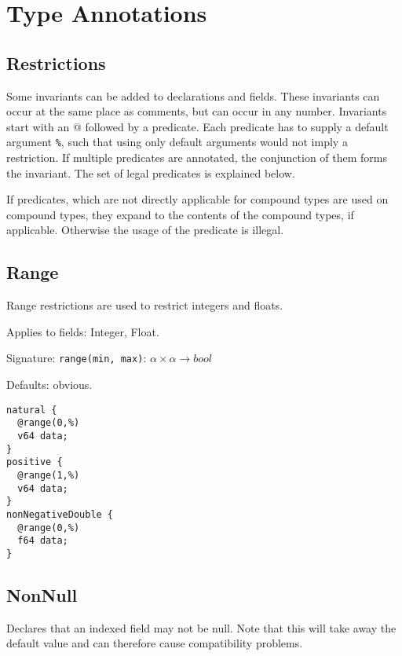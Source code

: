 \section{Type Annotations}

\subsection{Restrictions}
Some invariants can be added to declarations and fields. These invariants can occur at the same place as comments, but can occur in any number. Invariants start with an \textsc{@} followed by a predicate. Each predicate has to supply a default argument \texttt{\%}, such that using only default arguments would not imply a restriction.
If multiple predicates are annotated, the conjunction of them forms the invariant.
The set of legal predicates is explained below.

If predicates, which are not directly applicable for compound types are used on compound types, they expand to the contents of the compound types, if applicable. Otherwise the usage of the predicate is illegal.



\subsection*{Range}
Range restrictions are used to restrict integers and floats.

Applies to fields: Integer, Float.

Signature: \verb/range(min, max)/: $\alpha \times \alpha → bool$

Defaults: obvious.

\begin{lstlisting}[label=rangeExample,caption=Examples,language=skill]
natural {
  @range(0,%)
  v64 data;
}
positive {
  @range(1,%)
  v64 data;
}
nonNegativeDouble {
  @range(0,%)
  f64 data;
}
\end{lstlisting}

\subsection*{NonNull}
Declares that an indexed field may not be null. Note that this will take away the default value and can therefore cause compatibility problems.

